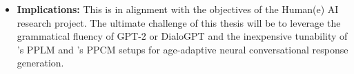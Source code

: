 \begin{enumerate}
\begin{itemize}
        \item \textbf{Implications:} This is in alignment with the objectives of the Human(e) AI research project. The ultimate challenge of this thesis will be to leverage the grammatical fluency of GPT-2 or DialoGPT and the inexpensive tunability of \citeauthor{dathathri2019plug}'s PPLM and \cite{madotto-etal-2020-plug}'s PPCM setups for age-adaptive neural conversational response generation.
    \end{itemize}
\end{enumerate}

